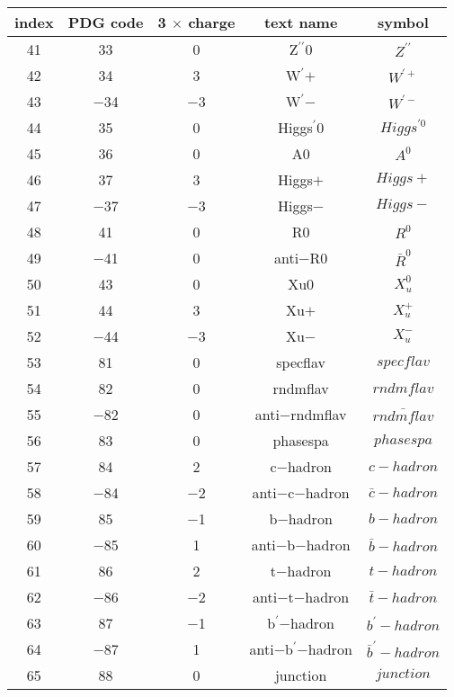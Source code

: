 \documentclass{article}
\begin{document}
\begin{table}[!htbp]
\centering
\begin{tabular}{|c|c|c|c|c|}
\hline
index & PDG code & 3 $\times$ charge & text name & symbol \\
\hline
41 & 33 & 0 & Z$^{\prime\prime}$0 & $Z^{\prime\prime}$ \\
\hline
42 & 34 & 3 & W$^{\prime}$$+$ & $W^{\prime+}$ \\
\hline
43 & $-$34 & $-$3 & W$^{\prime}$$-$ & $W^{\prime-}$ \\
\hline
44 & 35 & 0 & Higgs$^{\prime}$0 & $Higgs^{\prime0}$ \\
\hline
45 & 36 & 0 & A0 & $A^{0}$ \\
\hline
46 & 37 & 3 & Higgs$+$ & $Higgs+$ \\
\hline
47 & $-$37 & $-$3 & Higgs$-$ & $Higgs-$ \\
\hline
48 & 41 & 0 & R0 & $R^{0}$ \\
\hline
49 & $-$41 & 0 & anti$-$R0 & $\bar{R}^{0}$ \\
\hline
50 & 43 & 0 & Xu0 & $X_{u}^{0}$ \\
\hline
51 & 44 & 3 & Xu$+$ & $X_{u}^{+}$ \\
\hline
52 & $-$44 & $-$3 & Xu$-$ & $X_{u}^{-}$ \\
\hline
53 & 81 & 0 & specflav & $specflav$ \\
\hline
54 & 82 & 0 & rndmflav & $rndmflav$ \\
\hline
55 & $-$82 & 0 & anti$-$rndmflav & $\bar{rndmflav}$ \\
\hline
56 & 83 & 0 & phasespa & $phasespa$ \\
\hline
57 & 84 & 2 & c$-$hadron & $c-hadron$ \\
\hline
58 & $-$84 & $-$2 & anti$-$c$-$hadron & $\bar{c}-hadron$ \\
\hline
59 & 85 & $-$1 & b$-$hadron & $b-hadron$ \\
\hline
60 & $-$85 & 1 & anti$-$b$-$hadron & $\bar{b}-hadron$ \\
\hline
61 & 86 & 2 & t$-$hadron & $t-hadron$ \\
\hline
62 & $-$86 & $-$2 & anti$-$t$-$hadron & $\bar{t}-hadron$ \\
\hline
63 & 87 & $-$1 & b$^{\prime}$$-$hadron & $b^{\prime}-hadron$ \\
\hline
64 & $-$87 & 1 & anti$-$b$^{\prime}$$-$hadron & $\bar{b}^{\prime}-hadron$ \\
\hline
65 & 88 & 0 & junction & $junction$ \\
\hline

\end{tabular}
\end{table}
\end{document}
